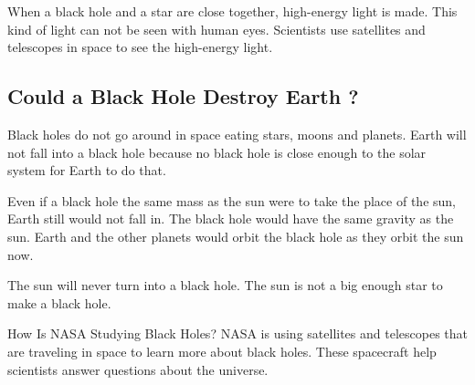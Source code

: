 \documentclass[../tuto-3.tex]{subfiles}
\begin{document}
	When a black hole and a star are close together, high-energy light is made. This kind of light can not be seen with human eyes. Scientists use satellites and telescopes in space to see the high-energy light.
	
	\subsection{Could a Black Hole Destroy Earth ?}
	Black holes do not go around in space eating stars, moons and planets. Earth will not fall into a black hole because no black hole is close enough to the solar system for Earth to do that.
	
	Even if a black hole the same mass as the sun were to take the place of the sun, Earth still would not fall in. The black hole would have the same gravity as the sun. Earth and the other planets would orbit the black hole as they orbit the sun now.
	
	The sun will never turn into a black hole. The sun is not a big enough star to make a black hole.
	
	How Is NASA Studying Black Holes?
	NASA is using satellites and telescopes that are traveling in space to learn more about black holes. These spacecraft help scientists answer questions about the universe.
	
	\pagebreak
	
\end{document}
